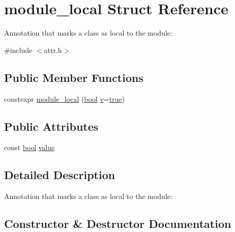 \hypertarget{structmodule__local}{}\section{module\+\_\+local Struct Reference}
\label{structmodule__local}


Annotation that marks a class as local to the module\+:  




{\ttfamily \#include $<$attr.\+h$>$}

\subsection*{Public Member Functions}
\begin{DoxyCompactItemize}
\item 
constexpr \mbox{\hyperlink{structmodule__local_a1a83d539578d66b2e77e497a7313ee61}{module\+\_\+local}} (\mbox{\hyperlink{asdl_8h_af6a258d8f3ee5206d682d799316314b1}{bool}} \mbox{\hyperlink{_s_d_l__opengl_8h_a10a82eabcb59d2fcd74acee063775f90}{v}}=\mbox{\hyperlink{asdl_8h_af6a258d8f3ee5206d682d799316314b1a08f175a5505a10b9ed657defeb050e4b}{true}})
\end{DoxyCompactItemize}
\subsection*{Public Attributes}
\begin{DoxyCompactItemize}
\item 
const \mbox{\hyperlink{asdl_8h_af6a258d8f3ee5206d682d799316314b1}{bool}} \mbox{\hyperlink{structmodule__local_a790e65f3530aa982bc27c82c10ae18d8}{value}}
\end{DoxyCompactItemize}


\subsection{Detailed Description}
Annotation that marks a class as local to the module\+: 

\subsection{Constructor \& Destructor Documentation}
\mbox{\label{structmodule__local_a1a83d539578d66b2e77e497a7313ee61}} 
